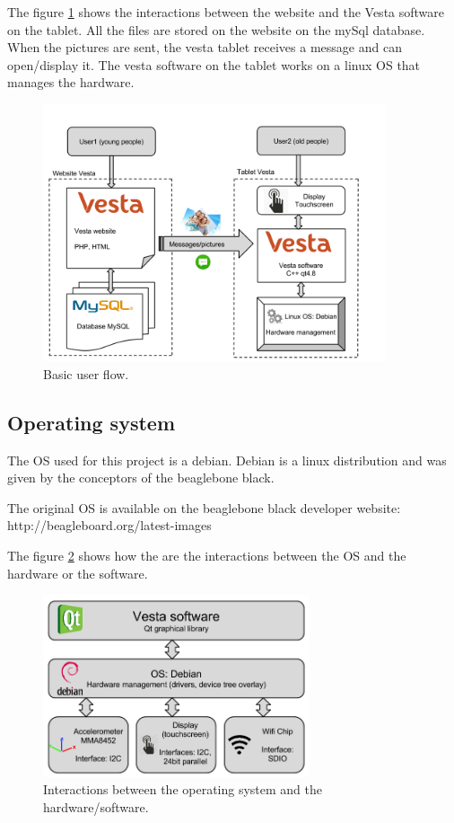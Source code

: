 \clearpage

The figure \ref{fig:user flow} shows the interactions between the website and the Vesta software on the tablet. All the files are stored on the website on the mySql database. When the pictures are sent, the vesta tablet receives a message and can open/display it. The vesta software on the tablet works on a linux OS that manages the hardware.

\begin{figure}[!htb]
    \centering
    \includegraphics[width=0.9\textwidth,keepaspectratio]{chap/softFig/block_diagram_vesta2.png}
    \caption{Basic user flow.}
    \label{fig:user flow}
\end{figure}

\clearpage

\subsection{Operating system}
The OS used for this project is a debian. Debian is a linux distribution and was given by the conceptors of the beaglebone black.

The original OS is available on the beaglebone black developer website: http://beagleboard.org/latest-images

The figure \ref{fig:OS} shows how the are the interactions between the OS and the hardware or the software.
 
\begin{figure}[!htb]
    \centering
    \includegraphics[width=0.7\textwidth,keepaspectratio]{chap/softFig/first_diagram2}
    \caption{Interactions between the operating system and the hardware/software.}
    \label{fig:OS}
\end{figure}

